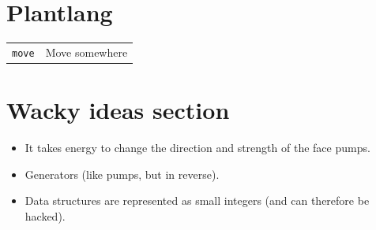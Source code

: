 \documentclass[10pt, a4paper, twocolumn]{article}
\begin{document}
\section{Plantlang}

\begin{tabularx}{\columnwidth}{@{}l>{\raggedright\arraybackslash}X@{}}
  \toprule

  \texttt{move} & Move somewhere \\
  

\end{tabularx}




\section{Wacky ideas section}

\begin{itemize}
\item It takes energy to change the direction and strength of the face
  pumps. 
\item Generators (like pumps, but in reverse).
\item Data structures are represented as small integers (and can
  therefore be hacked).
\end{itemize}
\end{document}

